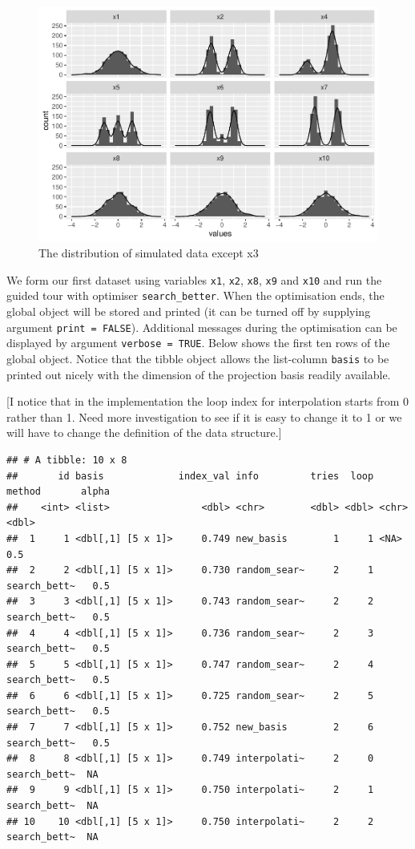 \documentclass[12pt]{article}
\begin{document}
\begin{figure}
\centering
\includegraphics{paper_files/figure-latex/origin-data-1.pdf}
\caption{\label{origin-data} The distribution of simulated data except
x3}
\end{figure}

We form our first dataset using variables \texttt{x1}, \texttt{x2},
\texttt{x8}, \texttt{x9} and \texttt{x10} and run the guided tour with
optimiser \texttt{search\_better}. When the optimisation ends, the
global object will be stored and printed (it can be turned off by
supplying argument \texttt{print\ =\ FALSE}). Additional messages during
the optimisation can be displayed by argument \texttt{verbose\ =\ TRUE}.
Below shows the first ten rows of the global object. Notice that the
tibble object allows the list-column \texttt{basis} to be printed out
nicely with the dimension of the projection basis readily available.

{[}I notice that in the implementation the loop index for interpolation
starts from 0 rather than 1. Need more investigation to see if it is
easy to change it to 1 or we will have to change the definition of the
data structure.{]}

\newpage

\begin{verbatim}
## # A tibble: 10 x 8
##       id basis             index_val info         tries  loop method       alpha
##    <int> <list>                <dbl> <chr>        <dbl> <dbl> <chr>        <dbl>
##  1     1 <dbl[,1] [5 x 1]>     0.749 new_basis        1     1 <NA>           0.5
##  2     2 <dbl[,1] [5 x 1]>     0.730 random_sear~     2     1 search_bett~   0.5
##  3     3 <dbl[,1] [5 x 1]>     0.743 random_sear~     2     2 search_bett~   0.5
##  4     4 <dbl[,1] [5 x 1]>     0.736 random_sear~     2     3 search_bett~   0.5
##  5     5 <dbl[,1] [5 x 1]>     0.747 random_sear~     2     4 search_bett~   0.5
##  6     6 <dbl[,1] [5 x 1]>     0.725 random_sear~     2     5 search_bett~   0.5
##  7     7 <dbl[,1] [5 x 1]>     0.752 new_basis        2     6 search_bett~   0.5
##  8     8 <dbl[,1] [5 x 1]>     0.749 interpolati~     2     0 search_bett~  NA  
##  9     9 <dbl[,1] [5 x 1]>     0.750 interpolati~     2     1 search_bett~  NA  
## 10    10 <dbl[,1] [5 x 1]>     0.750 interpolati~     2     2 search_bett~  NA
\end{verbatim}
\end{document}
